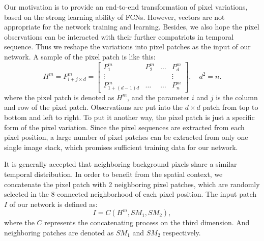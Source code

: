 \documentclass[journal]{IEEEtran}
\begin{document}
Our motivation is to provide an end-to-end transformation of pixel variations, based on the strong learning ability of FCNs. 
However, vectors are not appropriate for the network training and learning. 
Besides, we also hope the pixel observations can be interacted with their further compatriots in temporal sequence. 
Thus we reshape the variations into pixel patches as the input of our network. 
A sample of the pixel patch is like this:
\begin{equation}
H^m=P^m_{i+j\times d}=\begin{bmatrix}
 P^m_1& P^m_2  &\dots  &P^m_d \\ 
\vdots &  &  &\vdots \\ 
 P^m_{1+(d-1)d}& \dots & \dots & P^m_n
\end{bmatrix},\quad d^2=n.
\end{equation}
where the pixel patch is denoted as $H^m$, and the parameter $i$ and $j$ is the column and row of the pixel patch. 
Observations are put into the $d\times d$ patch from top to bottom and left to right.
To put it another way, the pixel patch is just a specific form of the pixel variation. 
Since the pixel sequences are extracted from each pixel position, a large number of pixel patches can be extracted from only one single image stack, which promises sufficient training data for our network.

It is generally accepted that neighboring background pixels share a similar temporal distribution.
In order to benefit from the spatial context, we concatenate the pixel patch with 2 neighboring pixel patches, which are randomly selected in the 8-connected neighborhood of each pixel position. 
The input patch $I$ of our network is defined as:
\begin{equation}
I = C(H^m, SM_1, SM_2),
\end{equation}
where the $C$ represents the concatenating process on the third dimension.
And neighboring patches are denoted as $SM_1$ and $SM_2$ respectively.
\end{document}
